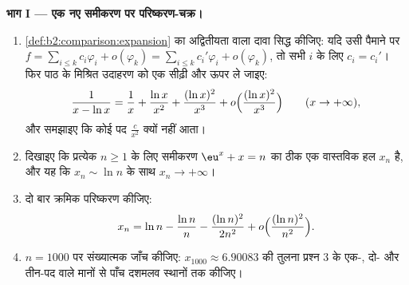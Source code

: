 \begin{problem}
\label{pb:b2:comparison:1}

\medskip
\noindent\textbf{भाग I --- एक नए समीकरण पर परिष्करण-चक्र।}
\begin{enumerate}
  \item \cref{def:b2:comparison:expansion} का अद्वितीयता वाला दावा सिद्ध कीजिए: यदि उसी पैमाने पर
        $f = \sum_{i\leq
        k} c_i\varphi_i + o(\varphi_k) = \sum_{i \leq k}
        c_i'\varphi_i + o(\varphi_k)$, तो सभी $i$ के लिए $c_i = c_i'$। फिर पाठ के मिश्रित उदाहरण को एक
        सीढ़ी और ऊपर ले जाइए:
        \[
        \frac{1}{x - \ln x} = \frac1x + \frac{\ln x}{x^2} +
        \frac{(\ln x)^2}{x^3} + o\Bigl(\frac{(\ln
        x)^2}{x^3}\Bigr) \qquad (x \to +\infty),
        \]
        और समझाइए कि कोई पद $\frac{c}{x^2}$ क्यों नहीं आता।
  \item दिखाइए कि प्रत्येक $n \geq 1$ के लिए समीकरण $\eu^x + x =
        n$ का ठीक एक वास्तविक हल
        $x_n$ है, और यह कि $x_n \sim \ln n$ के साथ $x_n
        \to +\infty$।
  \item दो बार क्रमिक परिष्करण कीजिए:
        \[
        x_n = \ln n - \frac{\ln n}{n} - \frac{(\ln n)^2}{2n^2} +
        o\Bigl(\frac{(\ln n)^2}{n^2}\Bigr).
        \]
  \item $n = 1000$ पर संख्यात्मक जाँच कीजिए: $x_{1000}
        \approx 6.90083$ की तुलना प्रश्न 3 के
        एक-, दो- और तीन-पद वाले मानों से पाँच दशमलव स्थानों तक कीजिए।
\end{enumerate}


\end{problem}
